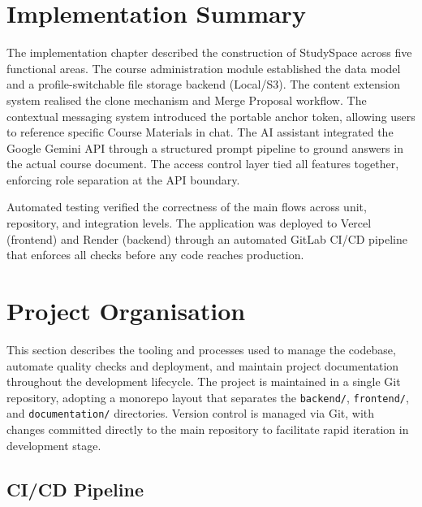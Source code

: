 \section{Implementation Summary}
\label{sec:impl-summary}

The implementation chapter described the construction of StudySpace across five functional
areas. The course administration module established the data model and a profile-switchable
file storage backend (Local/S3).
The content extension system realised the clone mechanism and Merge Proposal workflow. The
contextual messaging system introduced the portable anchor token, allowing users to reference
specific Course Materials in chat. The AI assistant integrated the Google Gemini API through a
structured prompt pipeline to ground answers in the actual course document. The access control
layer tied all features together, enforcing role separation at the API boundary.

Automated testing verified the correctness of the main flows across unit, repository, and
integration levels. The application was deployed to Vercel (frontend) and Render (backend)
through an automated GitLab CI/CD pipeline that enforces all checks before any code reaches
production.

\section{Project Organisation}
\label{sec:impl-project-org}

This section describes the tooling and processes used to manage the codebase, automate quality
checks and deployment, and maintain project documentation throughout the development lifecycle.
The project is maintained in a single Git repository, adopting a monorepo layout that separates the
\texttt{backend/}, \texttt{frontend/}, and \texttt{documentation/} directories. Version control
is managed via Git, with changes committed directly to the main repository to facilitate rapid iteration in development stage.

\subsection{CI/CD Pipeline}
\label{subsec:cicd}

